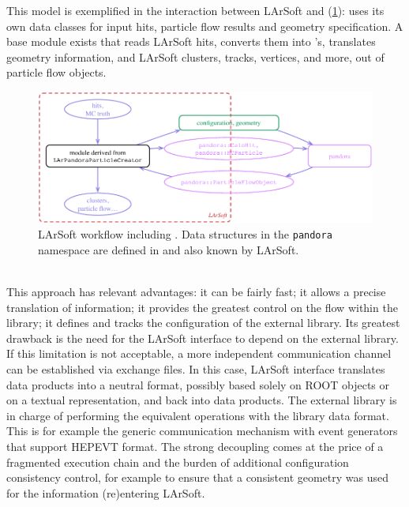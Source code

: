 This model is exemplified in the interaction between LArSoft and
\Pandora\cite{pandora} (\cref{fig:LArSoftAndPandora}): \Pandora uses
its own data classes for input hits, particle flow results and geometry
specification. A base module exists that reads LArSoft hits, converts
them into \Pandora's, translates geometry information,
and LArSoft clusters, tracks, vertices, and more,
out of \Pandora particle flow objects.
\begin{figure}
   \centering
   \includegraphics{figures/LArSoftAndPandora}
   \caption[Model of communication between LArSoft and \Pandora]{
      \label{fig:LArSoftAndPandora}
      LArSoft workflow including \Pandora.
      Data structures in the \texttt{pandora} namespace are defined in \Pandora
      and also known by LArSoft.
   }
\end{figure}\\
This approach has relevant advantages: it can be fairly fast; it allows
a precise translation of information; it provides the greatest control
on the flow within the library; it defines and tracks the configuration
of the external library. Its greatest drawback is the need for the
LArSoft interface to depend on the external library. If this limitation
is not acceptable, a more independent communication channel can be
established via exchange files. In this case, LArSoft interface
translates data products into a neutral format, possibly based solely on
ROOT objects or on a textual representation, and back into data
products. The external library is in charge of performing the equivalent
operations with the library data format. This is for example the generic
communication mechanism with event generators that support HEPEVT
format. The strong decoupling comes at the price of a fragmented
execution chain and the burden of additional configuration consistency
control, for example to ensure that a consistent geometry was used for
the information (re)entering LArSoft.
